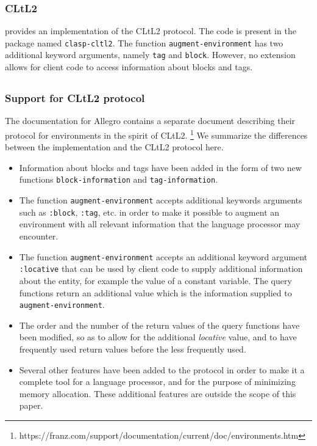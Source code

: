 \subsubsection{CLtL2}

\clasp{} provides an implementation of the CLtL2 protocol.
The code is present in the package named \texttt{clasp-cltl2}.  The
function \texttt{augment-environment} has two additional keyword
arguments, namely \texttt{tag} and \texttt{block}.  However, no
extension allows for client code to access information about blocks
and tags.

\subsection{\allegro{}}
\label{sec-previous-allegro}

\subsubsection{Support for CLtL2 protocol}

The documentation for Allegro \commonlisp{} contains a separate
document describing their protocol for environments in the spirit of
CLtL2.%
\footnote{https://franz.com/support/documentation/current/doc/environments.htm}
We summarize the differences between the \allegro{} implementation and
the CLtL2 protocol here.

\begin{itemize}
\item Information about blocks and tags have been added in the form of
  two new functions \texttt{block-information} and
  \texttt{tag-information}.
\item The function \texttt{augment-environment} accepts additional
  keywords arguments such as \texttt{:block}, \texttt{:tag}, etc. in
  order to make it possible to augment an environment with all
  relevant information that the language processor may encounter.
\item The function \texttt{augment-environment} accepts an additional
  keyword argument \texttt{:locative} that can be used by client code
  to supply additional information about the entity, for example the
  value of a constant variable. The query functions return an
  additional value which is the information supplied to
  \texttt{augment-environment}.
\item The order and the number of the return values of the query
  functions have been modified, so as to allow for the additional
  \emph{locative} value, and to have frequently used return values
  before the less frequently used.
\item Several other features have been added to the protocol in order
  to make it a complete tool for a language processor, and for the
  purpose of minimizing memory allocation.  These additional features
  are outside the scope of this paper.
\end{itemize}


